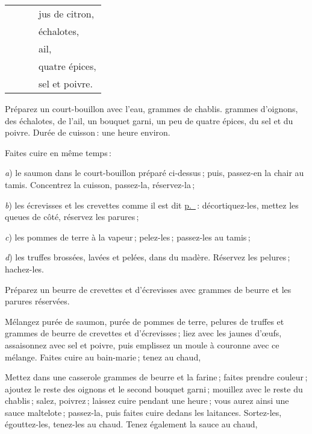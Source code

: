 \begin{longtable}{rrrp{16em}}
        &         &    & jus de citron,                                                                   \\
        &         &    & échalotes,                                                                       \\
        &         &    & ail,                                                                             \\
        &         &    & quatre épices,                                                                   \\
        &         &    & sel et poivre.                                                                   \\
\end{longtable}
\normalsize

Préparez un court-bouillon avec l’eau, {\mmm} grammes de chablis. {\mmm} grammes
d'oignons, des échalotes, de l'ail, un bouquet garni, un peu de quatre épices, du
sel et du poivre. Durée de cuisson : une heure environ.

Faites cuire en même temps :

\textit{a}) le saumon dans le court-bouillon préparé ci-dessus ; puis, passez-en la chair
au tamis. Concentrez la cuisson, passez-la, réservez-la ;

\textit{b}) les écrevisses et les crevettes comme il est dit
\hyperlink{p0287}{p. \pageref{pg0287}} : décortiquez-les, mettez les queues de
côté, réservez les parures ;

\textit{c}) les pommes de terre à la vapeur ; pelez-les ; passez-les au tamis ;

\textit{d}) les truffes brossées, lavées et pelées, dans du madère. Réservez
les pelures ; hachez-les.

Préparez un beurre de crevettes et d'écrevisses avec {\mmm} grammes de beurre et
les parures réservées.

Mélangez purée de saumon, purée de pommes de terre, pelures de truffes et
{\mmm} grammes de beurre de crevettes et d'écrevisses ; liez avec les jaunes d'œufs,
assaisonnez avec sel et poivre, puis emplissez un moule à couronne avec ce mélange.
Faites cuire au bain-marie ; tenez au chaud,

Mettez dans une casserole {\mmm} grammes de beurre et la farine ; faites prendre
couleur ; ajoutez le reste des oignons et le second bouquet garni ; mouillez
avec le reste du chablis ; salez, poivrez ; laissez cuire pendant une heure ;
vous aurez ainsi une sauce maltelote ; passez-la, puis faites cuire dedans les
laitances. Sortez-les, égouttez-les, tenez-les au chaud. Tenez également la
sauce au chaud,

